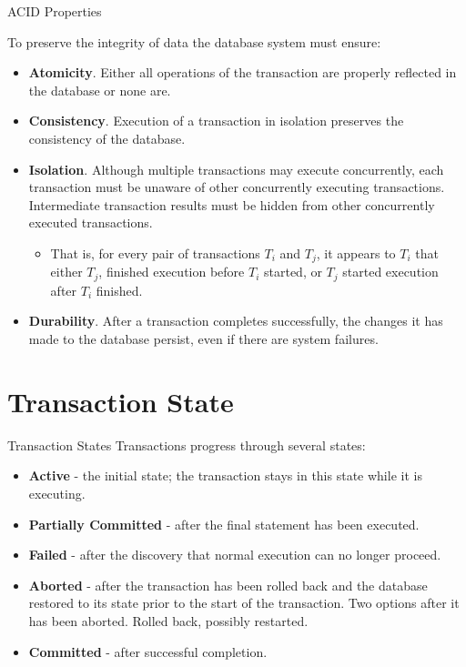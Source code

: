 \documentclass{beamer}
\begin{document}
\begin{frame}{ACID Properties}

    \scriptsize
    To preserve the integrity of data the database system must ensure:
        \begin{itemize}
            \item \textbf{Atomicity}. Either all operations of the transaction are properly reflected in the database or none are.
            \item \textbf{Consistency}. Execution of a transaction in isolation preserves the consistency of the database.
            \item \textbf{Isolation}. Although multiple transactions may execute concurrently, each transaction must be unaware of other concurrently executing transactions. Intermediate transaction results must be hidden from other concurrently executed transactions.
                \begin{itemize}
                    \scriptsize
                    \item That is, for every pair of transactions $T_i$ and $T_j$, it appears to $T_i$ that either $T_j$, finished execution before $T_i$ started, or $T_j$ started execution after $T_i$ finished.
                \end{itemize}
            \item \textbf{Durability}. After a transaction completes successfully, the changes it has made to the database persist, even if there are system failures.
        \end{itemize}

\end{frame}

\section{Transaction State}

\begin{frame}{Transaction States}
    Transactions progress through several states:
    \begin{itemize}
        \item \textbf{Active} - the initial state; the transaction stays in this state while it is executing.
        \item \textbf{Partially Committed} - after the final statement has been executed.
        \item \textbf{Failed} - after the discovery that normal execution can no longer proceed.
        \item \textbf{Aborted} - after the transaction has been rolled back and the database restored to its state prior to the start of the transaction. Two options after it has been aborted.  Rolled back, possibly restarted.
        \item \textbf{Committed} - after successful completion.
    \end{itemize}
\end{frame}
\end{document}
